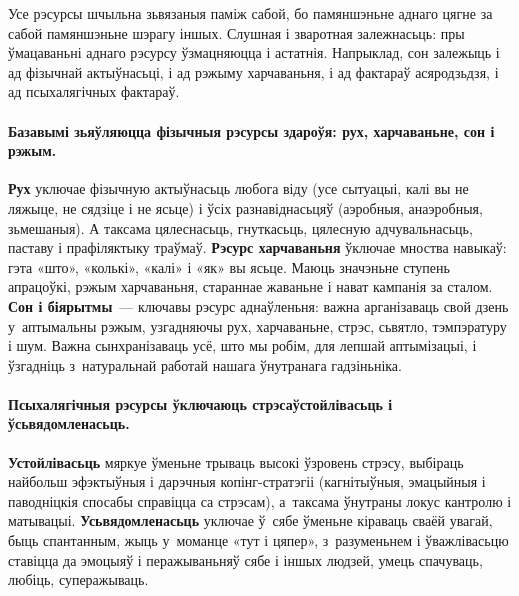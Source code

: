 Усе рэсурсы шчыльна зьвязаныя паміж сабой, бо памяншэньне аднаго цягне за сабой памяншэньне шэрагу іншых. Слушная і зваротная залежнасьць: пры ўмацаваньні аднаго рэсурсу ўзмацняюцца і астатнія. Напрыклад, сон залежыць і ад фізычнай актыўнасьці, і ад рэжыму харчаваньня, і ад фактараў асяродзьдзя, і ад псыхалягічных фактараў.


\paragraph{Базавымі зьяўляюцца фізычныя рэсурсы здароўя: рух, харчаваньне, сон і рэжым.} \textbf{Рух} уключае фізычную актыўнасьць любога віду (усе сытуацыі, калі вы не ляжыце, не сядзіце і не ясьце) і ўсіх разнавіднасьцяў (аэробныя, анаэробныя, зьмешаныя). А таксама цялеснасьць, гнуткасьць, цялесную адчувальнасьць, паставу і прафіляктыку траўмаў.
\textbf{Рэсурс харчаваньня} ўключае мноства навыкаў: гэта «што», «колькі», «калі» і «як» вы ясьце. Маюць значэньне ступень апрацоўкі, рэжым харчаваньня, стараннае жаваньне і нават кампанія за сталом.
\textbf{Сон і біярытмы}~--- ключавы рэсурс аднаўленьня: важна арганізаваць свой дзень у~аптымальны рэжым, узгадняючы рух, харчаваньне, стрэс, сьвятло, тэмпэратуру і шум. Важна сынхранізаваць усё, што мы робім, для лепшай аптымізацыі, і ўзгадніць з~натуральнай работай нашага ўнутранага гадзіньніка.

\paragraph{Псыхалягічныя рэсурсы ўключаюць стрэсаўстойлівасьць і ўсьвядомленасьць.} \textbf{Устойлівасьць} мяркуе ўменьне трываць высокі ўзровень стрэсу, выбіраць найбольш эфэктыўныя і дарэчныя копінг-стратэгіі (кагнітыўныя, эмацыйныя і паводніцкія спосабы справіцца са стрэсам), а~таксама ўнутраны локус кантролю і матывацыі. \textbf{Усьвядомленасьць} уключае ў~сябе ўменьне кіраваць сваёй увагай, быць спантанным, жыць у~моманце «тут і цяпер», з~разуменьнем і ўважлівасьцю ставіцца да эмоцыяў і перажываньняў сябе і іншых людзей, умець спачуваць, любіць, суперажываць.

